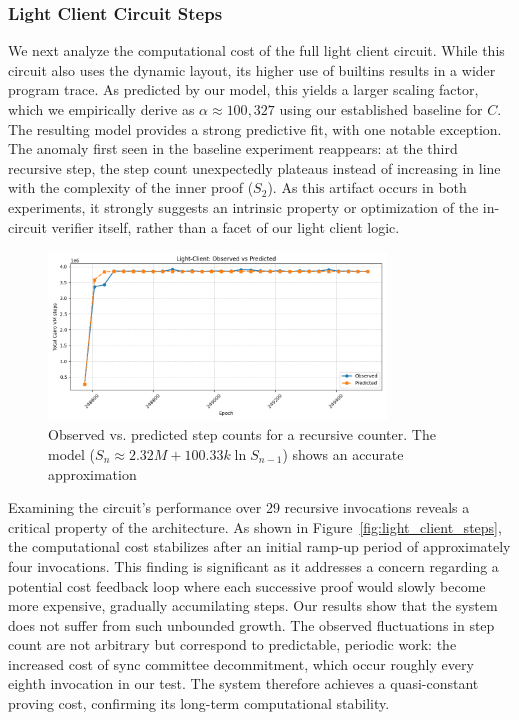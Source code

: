 \documentclass[runningheads]{llncs}
\begin{document}
\subsubsection{Light Client Circuit Steps}
We next analyze the computational cost of the full light client circuit. While this circuit also uses the dynamic layout, its higher use of builtins results in a wider program trace. As predicted by our model, this yields a larger scaling factor, which we empirically derive as \(\alpha \approx 100,327\) using our established baseline for \(C\). The resulting model provides a strong predictive fit, with one notable exception. The anomaly first seen in the baseline experiment reappears: at the third recursive step, the step count unexpectedly plateaus instead of increasing in line with the complexity of the inner proof (\(S_2\)). As this artifact occurs in both experiments, it strongly suggests an intrinsic property or optimization of the in-circuit verifier itself, rather than a facet of our light client logic.

\begin{figure}[H]
    \centering
    \includegraphics[width=0.8\textwidth]{diagrams/light_client_observed_vs_predicted.png}
    \caption{Observed vs. predicted step counts for a recursive counter. The model (\(S_n \approx 2.32M + 100.33k \ln S_{n-1}\)) shows an accurate approximation}
    \label{fig:light_client_prediction}
\end{figure}

Examining the circuit's performance over 29 recursive invocations reveals a critical property of the architecture. As shown in Figure~\ref{fig:light_client_steps}, the computational cost stabilizes after an initial ramp-up period of approximately four invocations. This finding is significant as it addresses a concern regarding a potential cost feedback loop where each successive proof would slowly become more expensive, gradually accumilating steps. Our results show that the system does not suffer from such unbounded growth. The observed fluctuations in step count are not arbitrary but correspond to predictable, periodic work: the increased cost of sync committee decommitment, which occur roughly every eighth invocation in our test. The system therefore achieves a quasi-constant proving cost, confirming its long-term computational stability.
\end{document}

